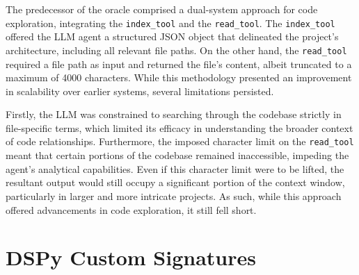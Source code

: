 \documentclass[
  a4paper,
  DIV=11,
  numbers=noendperiod]{scrreprt}
\theoremstyle{definition}
\theoremstyle{remark}
\begin{document}
\begin{enumerate}
  The predecessor of the oracle comprised a dual-system approach for
  code exploration, integrating the \texttt{index\_tool} and the
  \texttt{read\_tool}. The \texttt{index\_tool} offered the LLM agent a
  structured JSON object that delineated the project's architecture,
  including all relevant file paths. On the other hand, the
  \texttt{read\_tool} required a file path as input and returned the
  file's content, albeit truncated to a maximum of 4000 characters.
  While this methodology presented an improvement in scalability over
  earlier systems, several limitations persisted.

  Firstly, the LLM was constrained to searching through the codebase
  strictly in file-specific terms, which limited its efficacy in
  understanding the broader context of code relationships. Furthermore,
  the imposed character limit on the \texttt{read\_tool} meant that
  certain portions of the codebase remained inaccessible, impeding the
  agent's analytical capabilities. Even if this character limit were to
  be lifted, the resultant output would still occupy a significant
  portion of the context window, particularly in larger and more
  intricate projects. As such, while this approach offered advancements
  in code exploration, it still fell short.
\end{enumerate}

\chapter{DSPy Custom Signatures}\label{sec-signatures}
\end{document}
